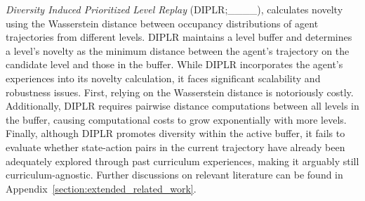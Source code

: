 {\em Diversity Induced Prioritized Level Replay} (DIPLR;____), calculates novelty using the Wasserstein distance between occupancy distributions of agent trajectories from different levels. DIPLR maintains a level buffer and determines a level's novelty as the minimum distance between the agent's trajectory on the candidate level and those in the buffer. While DIPLR incorporates the agent’s experiences into its novelty calculation, it faces significant scalability and robustness issues. First, relying on the Wasserstein distance is notoriously costly. Additionally, DIPLR requires pairwise distance computations between all levels in the buffer, causing computational costs to grow exponentially with more levels. Finally, although DIPLR promotes diversity within the active buffer, it fails to evaluate whether state-action pairs in the current trajectory have already been adequately explored through past curriculum experiences, making it arguably still curriculum-agnostic. Further discussions on relevant literature can be found in Appendix~\ref{section:extended_related_work}.